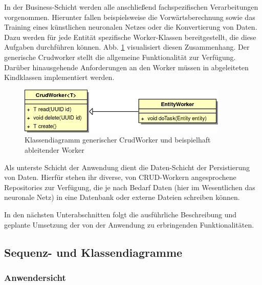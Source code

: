 In der Business-Schicht werden alle anschließend fachspezifischen Verarbeitungen vorgenommen. Hierunter fallen beispielsweise die Vorwärtsberechnung sowie das Training eines künstlichen neuronalen Netzes oder die Konvertierung von Daten. Dazu werden für jede Entität spezifische Worker-Klassen bereitgestellt, die diese Aufgaben durchführen können. Abb. \ref{CrudMin} visualisiert diesen Zusammenhang. Der generische Crudworker stellt die allgemeine Funktionalität zur Verfügung. Darüber hinausgehende Anforderungen an den Worker müssen in abgeleiteten Kindklassen implementiert werden.

\begin{figure}[H]
\begin{center}
\includegraphics[width=10cm]{Abbildungen/UML/jan/workerClassDiagramm.png}
\caption{Klassendiagramm generischer CrudWorker und beispielhaft ableitender Worker}
\label{CrudMin}
\end{center}
\end{figure}

Als unterste Schicht der Anwendung dient die Daten-Schicht der Persistierung von Daten. Hierfür stehen ihr diverse, von CRUD-Workern angesprochene Repositories zur Verfügung, die je nach Bedarf Daten (hier im Wesentlichen das neuronale Netz) in eine Datenbank oder externe Dateien schreiben können.

In den nächsten Unterabschnitten folgt die ausführliche Beschreibung und geplante Umsetzung der von der Anwendung zu erbringenden Funktionalitäten.  

\subsection{Sequenz- und Klassendiagramme}
\subsubsection{Anwendersicht}

